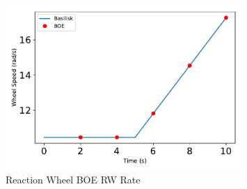 \begin{figure}[htbp]\centerline{\includegraphics[width=0.8\textwidth]{AutoTeX/ReactionWheelBOERWRate}}\caption{Reaction Wheel BOE RW Rate}\label{fig:ReactionWheelBOERWRate}\end{figure}